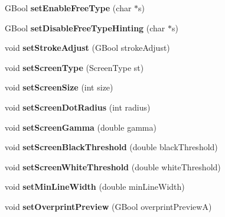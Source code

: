 \begin{DoxyCompactItemize}
\mbox{\label{class_global_params_a08b64b76df591e35257d3ffe74863e16}} 
G\+Bool {\bfseries set\+Enable\+Free\+Type} (char $\ast$s)
\item 
\mbox{\label{class_global_params_ab386a05014204d1f655b6a20c690db81}} 
G\+Bool {\bfseries set\+Disable\+Free\+Type\+Hinting} (char $\ast$s)
\item 
\mbox{\label{class_global_params_a92d15636ba58be997ffc8fc28bc0204a}} 
void {\bfseries set\+Stroke\+Adjust} (G\+Bool stroke\+Adjust)
\item 
\mbox{\label{class_global_params_ac74b96e6425b9aa832c1be9c2873460d}} 
void {\bfseries set\+Screen\+Type} (Screen\+Type st)
\item 
\mbox{\label{class_global_params_a2d86fce49e3530deb1b5ad86387cf1c0}} 
void {\bfseries set\+Screen\+Size} (int size)
\item 
\mbox{\label{class_global_params_a239dfba1249296f39c2805675226456d}} 
void {\bfseries set\+Screen\+Dot\+Radius} (int radius)
\item 
\mbox{\label{class_global_params_aa78a7074b5492e5318dd3f0224353ff9}} 
void {\bfseries set\+Screen\+Gamma} (double gamma)
\item 
\mbox{\label{class_global_params_a8a7d0f6d754d256f049c53d32f40d489}} 
void {\bfseries set\+Screen\+Black\+Threshold} (double black\+Threshold)
\item 
\mbox{\label{class_global_params_aa9d917ea53360bfdf1ea23171af486e5}} 
void {\bfseries set\+Screen\+White\+Threshold} (double white\+Threshold)
\item 
\mbox{\label{class_global_params_a132369934d9cc854370357789cf5a8aa}} 
void {\bfseries set\+Min\+Line\+Width} (double min\+Line\+Width)
\item 
\mbox{\label{class_global_params_a9629dbaa117c294a018a4d6dafa74573}} 
void {\bfseries set\+Overprint\+Preview} (G\+Bool overprint\+PreviewA)

\end{DoxyCompactItemize}
